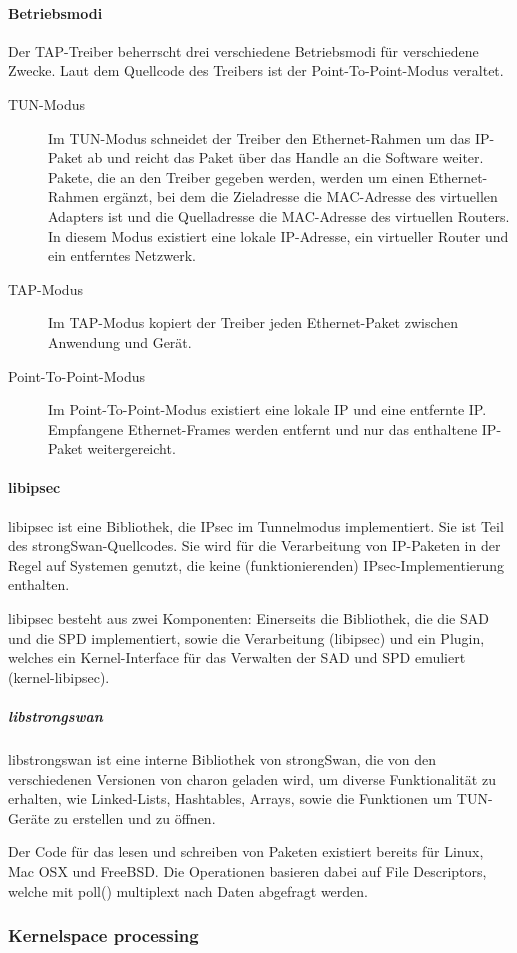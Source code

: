 \paragraph{Betriebsmodi}
Der TAP-Treiber beherrscht drei verschiedene Betriebsmodi für verschiedene Zwecke.
Laut dem Quellcode des Treibers ist der Point-To-Point-Modus veraltet.
\begin{description}
\item [TUN-Modus] Im TUN-Modus schneidet der Treiber den Ethernet-Rahmen um das 
IP-Paket ab und reicht das Paket über das Handle an die Software weiter. 
Pakete, die an den Treiber gegeben werden, werden um einen Ethernet-Rahmen
ergänzt, bei dem die Zieladresse die MAC-Adresse des virtuellen Adapters ist 
und die Quelladresse die MAC-Adresse des virtuellen Routers.
In diesem Modus existiert eine lokale IP-Adresse, ein virtueller Router und 
ein entferntes Netzwerk.
\item [TAP-Modus] Im TAP-Modus kopiert der Treiber jeden Ethernet-Paket zwischen 
Anwendung und Gerät.
\item [Point-To-Point-Modus] Im Point-To-Point-Modus existiert eine lokale IP 
und eine entfernte IP. Empfangene Ethernet-Frames werden entfernt und nur
das enthaltene IP-Paket weitergereicht.
\end{description}

\paragraph{libipsec}
libipsec ist eine Bibliothek, die IPsec im Tunnelmodus implementiert.
Sie ist Teil des strongSwan-Quellcodes. Sie wird für die Verarbeitung von IP-Paketen
in der Regel auf Systemen genutzt, die keine (funktionierenden) IPsec-Implementierung
enthalten.

libipsec besteht aus zwei Komponenten: Einerseits die Bibliothek, die die SAD und die SPD
implementiert, sowie die Verarbeitung (libipsec) und ein Plugin, welches ein Kernel-Interface
für das Verwalten der \ac{SAD} und \ac{SPD} emuliert (kernel-libipsec).
\subparagraph{libstrongswan}
libstrongswan ist eine interne Bibliothek von strongSwan, die von den verschiedenen
Versionen von charon geladen wird, um diverse Funktionalität zu erhalten, wie
Linked-Lists, Hashtables, Arrays, sowie die Funktionen um TUN-Geräte zu erstellen und zu öffnen.

Der Code für das lesen und schreiben von Paketen existiert bereits für Linux, Mac OSX
und FreeBSD.
Die Operationen basieren dabei auf File Descriptors, welche mit poll() multiplext nach
Daten abgefragt werden.

\subsubsection{Kernelspace processing}

